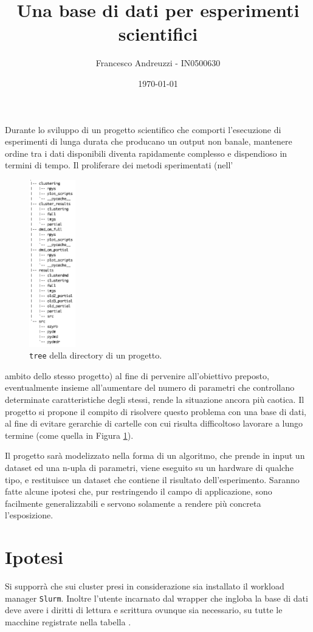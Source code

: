 \documentclass{article}
\title{Una base di dati per esperimenti scientifici}
\author{Francesco Andreuzzi - IN0500630}
\date{\today}
\begin{document}
\maketitle

Durante lo sviluppo di un progetto scientifico che comporti l'esecuzione di esperimenti di lunga durata che producano un output non banale, mantenere ordine tra i dati disponibili diventa rapidamente complesso e dispendioso in termini di tempo. Il proliferare dei metodi sperimentati (nell'\hphantom{xcjxxsksjskksksk}
\begin{figure}
    \vspace{-0.9cm}
    \includegraphics[width=2cm]{res/tree_brutto.png}
    \caption{\texttt{tree} della directory di un progetto.}\label{fig:tree}
\end{figure}
ambito dello stesso progetto) al fine di pervenire all'obiettivo preposto, eventualmente insieme all'aumentare del numero di parametri che controllano determinate caratteristiche degli stessi, rende la situazione ancora più caotica.  Il progetto si propone il compito di risolvere questo problema con una base di dati, al fine di evitare gerarchie di cartelle con cui risulta difficoltoso lavorare a lungo termine (come quella in Figura \ref{fig:tree}).

Il progetto sarà modelizzato nella forma di un algoritmo, che prende in input un dataset ed una n-upla di parametri, viene eseguito su un hardware di qualche tipo, e restituisce un dataset che contiene il risultato dell'esperimento. Saranno fatte alcune ipotesi che, pur restringendo il campo di applicazione, sono facilmente generalizzabili e servono solamente a rendere più concreta l'esposizione.

\section{Ipotesi}
\label{sec:ipotesi}
Si supporrà che sui cluster presi in considerazione sia installato il workload manager \texttt{Slurm}. Inoltre l'utente incarnato dal wrapper che ingloba la base di dati deve avere i diritti di lettura e scrittura ovunque sia necessario, su tutte le macchine registrate nella tabella .
\end{document}
